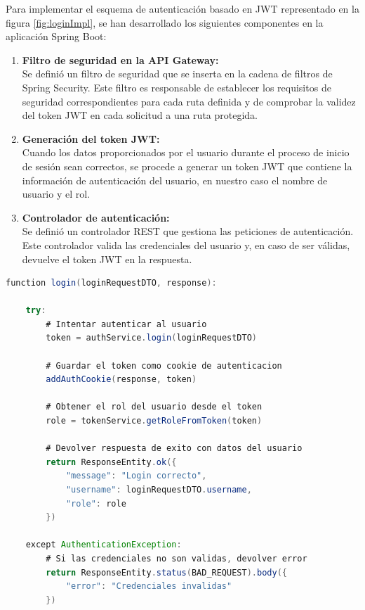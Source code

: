 Para implementar el esquema de autenticación basado en JWT representado en la figura \ref{fig:loginImpl}, se han desarrollado los siguientes componentes en la aplicación Spring Boot:
\vspace{0.5em}
\begin{enumerate}[label=\textbf{\arabic*.}]
    \item \textbf{Filtro de seguridad en la API Gateway:} \\
    Se definió un filtro de seguridad que se inserta en la cadena de filtros de Spring Security\cite{springsecurityjwt}. Este filtro es responsable de establecer los requisitos de seguridad correspondientes para cada ruta definida  y de comprobar la validez del token JWT en cada solicitud a una ruta protegida.

    \item \textbf{Generación del token JWT:} \\
    Cuando los datos proporcionados por el usuario durante el proceso de inicio de sesión sean correctos, se procede a generar un token JWT que contiene la información de autenticación del usuario, en nuestro caso el nombre de usuario y el rol.

    \item \textbf{Controlador de autenticación:} \\
    Se definió un controlador REST que gestiona las peticiones de autenticación. Este controlador valida las credenciales del usuario y, en caso de ser válidas, devuelve el token JWT en la respuesta.
\end{enumerate}


\begin{lstlisting}[language=Java, caption={Pseudocódigo del controlador login}]
function login(loginRequestDTO, response):

    try:
        # Intentar autenticar al usuario
        token = authService.login(loginRequestDTO)

        # Guardar el token como cookie de autenticacion
        addAuthCookie(response, token)

        # Obtener el rol del usuario desde el token
        role = tokenService.getRoleFromToken(token)

        # Devolver respuesta de exito con datos del usuario
        return ResponseEntity.ok({
            "message": "Login correcto",
            "username": loginRequestDTO.username,
            "role": role
        })

    except AuthenticationException:
        # Si las credenciales no son validas, devolver error
        return ResponseEntity.status(BAD_REQUEST).body({
            "error": "Credenciales invalidas"
        })
\end{lstlisting}

